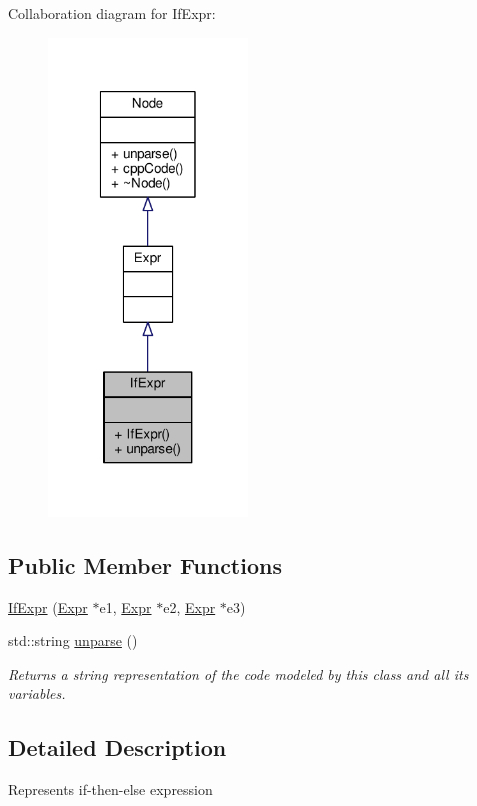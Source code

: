 Collaboration diagram for If\-Expr\-:\nopagebreak
\begin{figure}[H]
\begin{center}
\leavevmode
\includegraphics[width=150pt]{classIfExpr__coll__graph}
\end{center}
\end{figure}
\subsection*{Public Member Functions}
\begin{DoxyCompactItemize}
\item 
\hyperlink{classIfExpr_a8ade872da7dc8d8d80c6d5897353e0ae}{If\-Expr} (\hyperlink{classExpr}{Expr} $\ast$e1, \hyperlink{classExpr}{Expr} $\ast$e2, \hyperlink{classExpr}{Expr} $\ast$e3)
\item 
std\-::string \hyperlink{classIfExpr_a4b4c34fffb9539bac51cf5eb35e30081}{unparse} ()
\begin{DoxyCompactList}\small\item\em Returns a string representation of the code modeled by this class and all its variables. \end{DoxyCompactList}\end{DoxyCompactItemize}


\subsection{Detailed Description}
Represents if-\/then-\/else expression \par
 

